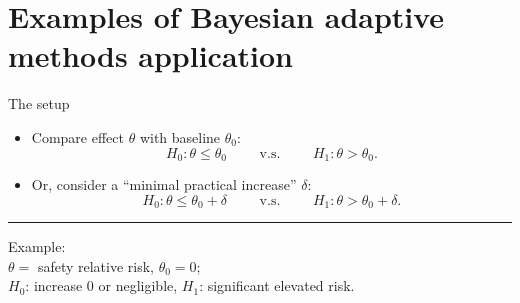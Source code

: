\documentclass[11pt
,fragile=singleslide
,xcolor=dvipsnames
]{beamer}
\begin{document}
\section{Examples of Bayesian adaptive methods application}


\begin{frame}{The setup}
	\begin{itemize}
		\item Compare effect $\theta$ with baseline $\theta_0$:
		\begin{equation*}
		H_0: \theta \leq \theta_0 \qquad \text{ v.s. } \qquad H_1: \theta > \theta_0.
		\end{equation*}
		\pause
		\item Or, consider a ``minimal practical increase'' $\delta$:
		\begin{equation*}
		H_0: \theta \leq \theta_0 + \delta \qquad \text{ v.s. } \qquad H_1: \theta > \theta_0 + \delta.
		\end{equation*}
	\end{itemize}

	\vfill
\rule{0.6\textwidth}{0.4pt}

\footnotesize{
	Example:\\
	$\theta =$ safety relative risk, $\theta_0 = 0$; \\
	$H_0$: increase 0 or negligible, $H_1$: significant elevated risk.
}
	
\end{frame}
\end{document}
